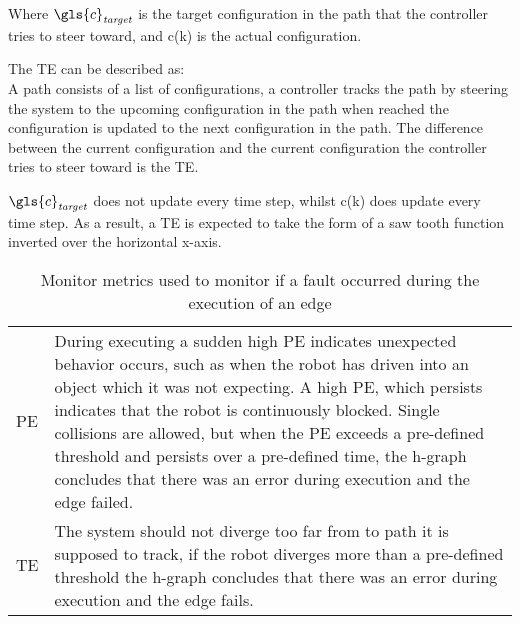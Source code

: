 Where $\gls{c}_\mathit{target}$ is the target configuration in the path that the controller tries to steer toward, and \gls{c}(\gls{k}) is the actual configuration.\bs

The \acl{TE} can be described as:\\ A path consists of a list of configurations, a controller tracks the path by steering the system to the upcoming configuration in the path when reached the configuration is updated to the next configuration in the path. The difference between the current configuration and the current configuration the controller tries to steer toward is the \ac{TE}.\bs

$\gls{c}_\mathit{target}$ does not update every time step, whilst \gls{c}(\gls{k}) does update every time step. As a result, a  \ac{TE} is expected to take the form of a saw tooth function inverted over the horizontal x-axis.\bs

\noindent
\begin{table}[H]
\centering
\begin{tabular}%
  {>{\raggedleft\arraybackslash}p{}%
   >{\raggedright\arraybackslash}p{}}
\acf{PE}&  During executing a sudden high \ac{PE} indicates unexpected behavior occurs, such as when the robot has driven into an object which it was not expecting. A high \ac{PE}, which persists indicates that the robot is continuously blocked. Single collisions are allowed, but when the \ac{PE} exceeds a pre-defined threshold and persists over a pre-defined time, the \ac{h-graph} concludes that there was an error during execution and the edge failed.\\
\acf{TE}& The system should not diverge too far from to path it is supposed to track, if the robot diverges more than a pre-defined threshold the \ac{h-graph} concludes that there was an error during execution and the edge fails. \\
\end{tabular}
\caption{Monitor metrics used to monitor if a fault occurred during the execution of an edge}%
\label{table:monitoring_edge_metrics}
\end{table}
